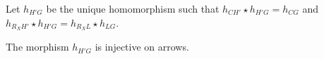 \begin{lemma}
    \label{lem:inj_graph_homo}
    Let $h_{H'G}$ be the unique homomorphism such that $h_{CH'} \star h_{H'G} = h_{CG}$ and $h_{R_XH'} \star h_{H'G} = h_{R_XL} \star h_{LG}$.
            

   The morphism $h_{H'G}$ is injective on arrows.

\end{lemma}
